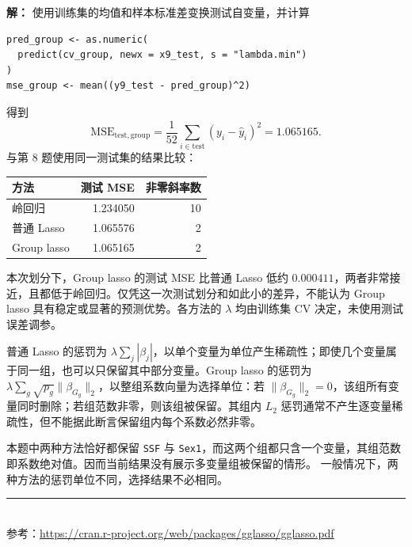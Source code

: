 \documentclass[12pt,a4paper]{article}
\begin{document}
\begin{answerbox}
\textbf{解：}
使用训练集的均值和样本标准差变换测试自变量，并计算
\begin{lstlisting}[style=rcode]
pred_group <- as.numeric(
  predict(cv_group, newx = x9_test, s = "lambda.min")
)
mse_group <- mean((y9_test - pred_group)^2)
\end{lstlisting}
得到
$$
\mathrm{MSE}_{\mathrm{test,group}}
=\frac{1}{52}\sum_{i\in\mathrm{test}}(y_i-\hat y_i)^2
=\boxed{1.065165}.
$$
与第 8 题使用同一测试集的结果比较：
\begin{center}
\begin{tabular}{lrr}
\toprule
方法 & 测试 MSE & 非零斜率数 \\
\midrule
岭回归 & 1.234050 & 10 \\
普通 Lasso & 1.065576 & 2 \\
Group lasso & 1.065165 & 2 \\
\bottomrule
\end{tabular}
\end{center}
本次划分下，Group lasso 的测试 MSE 比普通 Lasso 低约 $0.000411$，两者非常接近，且都低于岭回归。仅凭这一次测试划分和如此小的差异，不能认为 Group lasso 具有稳定或显著的预测优势。各方法的 $\lambda$ 均由训练集 CV 决定，未使用测试误差调参。

普通 Lasso 的惩罚为 $\lambda\sum_j|\beta_j|$，以单个变量为单位产生稀疏性；即使几个变量属于同一组，也可以只保留其中部分变量。Group lasso 的惩罚为 $\lambda\sum_g\sqrt{p_g}\|\beta_{G_g}\|_2$，以整组系数向量为选择单位：若 $\|\beta_{G_g}\|_2=0$，该组所有变量同时删除；若组范数非零，则该组被保留。其组内 $L_2$ 惩罚通常不产生逐变量稀疏性，但不能据此断言保留组内每个系数必然非零。

本题中两种方法恰好都保留 \texttt{SSF} 与 \texttt{Sex1}，而这两个组都只含一个变量，其组范数即系数绝对值。因而当前结果没有展示多变量组被保留的情形。
一般情况下，两种方法的惩罚单位不同，选择结果不必相同。
\end{answerbox}

\begin{center}
{\color{linegray}\rule{0.9\textwidth}{0.8pt}}\\[0.5em]
{\small\color{textgray} 参考：\url{https://cran.r-project.org/web/packages/gglasso/gglasso.pdf}}
\end{center}
\end{document}
